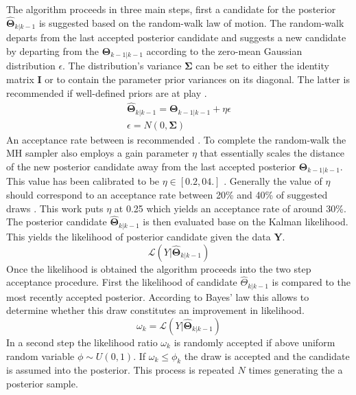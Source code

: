 \documentclass[12pt,a4paper,english]{article} %
\newcommand{\matr}[1]{\mathbf{#1}} %
\newcommand{\Lagr}{\mathcal{L}} %
\begin{document}
	The algorithm proceeds in three main steps, first a candidate for the posterior $\matr{\hat{\Theta}}_{k|k-1}$ is suggested based on the random-walk law of motion. The random-walk departs from the last accepted posterior candidate and suggests a new candidate by departing from the $\matr{\Theta}_{k-1|k-1}$ according to the zero-mean Gaussian distribution $\epsilon$. The distribution's variance $\matr{\Sigma}$ can be set to either the identity matrix $\matr{I}$ or to contain the parameter prior variances on its diagonal. The latter is recommended if well-defined priors are at play \cite{herbst_bayesian_2016}.
	\begin{equation}
		\begin{aligned}
			\matr{\hat{\Theta}}_{k|k-1} = \matr{\Theta}_{k-1|k-1} + \eta \epsilon \\
			\epsilon = N(0, \matr{\Sigma})
		\end{aligned}
	\end{equation}
	An acceptance rate between is recommended . To complete the random-walk the MH sampler also employs a gain parameter $\eta$ that essentially scales the distance of the new posterior candidate away from the last accepted posterior $\matr{\Theta}_{k-1|k-1}$. This value has been calibrated to be $\eta \in [0.2, 04.]$ \cite{gelman_weak_1997}. Generally the value of $\eta$ should correspond to an acceptance rate between 20\% and 40\% of suggested draws \cite{herbst_bayesian_2016}. This work puts $\eta$ at 0.25 which yields an acceptance rate of around 30\%.
	The posterior candidate $\matr{\hat{\Theta}}_{k|k-1}$ is then evaluated base on the Kalman likelihood. This yields the likelihood of posterior candidate given the data $\matr Y$.
	\[
		 \Lagr(Y| \matr{\hat{\Theta}}_{k|k-1})
	\]
	Once the likelihood is obtained the algorithm proceeds into the two step acceptance procedure. First the likelihood of candidate $\hat{\Theta}_{k|k-1}$ is compared to the most recently accepted posterior. According to Bayes' law this allows to determine whether this draw constitutes an improvement in likelihood.	
	\begin{equation}
		\omega_k = \Lagr(Y|\matr{\hat{\Theta}}_{k|k-1})
	\end{equation}
	In a second step the likelihood ratio $\omega_k$ is randomly accepted if above uniform random variable $\phi \sim U(0, 1)$. If $\omega_k \leq \phi_k$ the draw is accepted and the candidate is assumed into the posterior. This process is repeated $N$ times generating the a posterior sample. 
\end{document}
